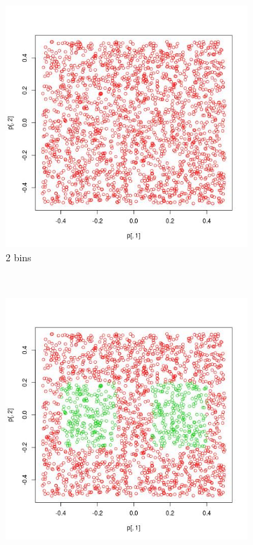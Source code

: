 \documentclass[12pt, a4paper]{article}
\begin{document}
\begin{figure}
    \centering

    \begin{subfigure}[b]{0.42\textwidth}
        \includegraphics[width=\textwidth]{prediccion2}
        \caption{2 bins}
    \end{subfigure}
      ~ %
    \begin{subfigure}[b]{0.42\textwidth}
        \includegraphics[width=\textwidth]{prediccion5}

\end{subfigure}
\end{figure}
\end{document}
